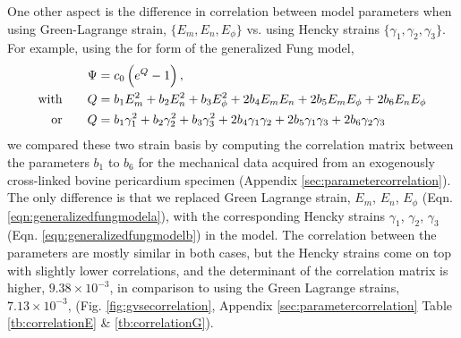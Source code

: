 	One other aspect is the difference in correlation between model parameters when using Green-Lagrange strain, $\{E_m, E_n, E_\phi\}$ vs. using Hencky strains $\{\gamma_1, \gamma_2, \gamma_3 \}$. For example, using the for form of the generalized Fung model,
\begin{subequations} \label{eqn:generalizedfungmodel}
\begin{align}
\Psi 	&= c_0 \left(e^{Q} - 1\right),\notag \\
\mathrm{with}	\qquad	Q	&= b_1 E_m^2 + b_2 E_n^2 + b_3 E_\phi^2 + 2 b_4 E_m E_n + 2 b_5 E_mE_\phi + 2 b_6 E_nE_\phi	\label{eqn:generalizedfungmodela} \\ 
\mathrm{or}		\qquad	Q	&= b_1 \gamma_1^2 + b_2 \gamma_2^2 + b_3 \gamma_3^2 + 2 b_4 \gamma_1\gamma_2 + 2 b_5 \gamma_1\gamma_3 + 2 b_6 \gamma_2\gamma_3	\label{eqn:generalizedfungmodelb} 
\end{align}
\end{subequations}
we compared these two strain basis by computing the correlation matrix between the parameters $b_1$ to $b_6$ for the mechanical data acquired from an exogenously cross-linked bovine pericardium specimen \cite{sun_response_2004} (Appendix \ref{sec:parametercorrelation}). The only difference is that we replaced Green Lagrange strain, $E_m$, $E_n$, $E_\phi$ (Eqn. \ref{eqn:generalizedfungmodela}), with the corresponding Hencky strains $\gamma_1$, $\gamma_2$, $\gamma_3$ (Eqn. \ref{eqn:generalizedfungmodelb}) in the model. The correlation between the parameters are mostly similar in both cases, but the Hencky strains come on top with slightly lower correlations, and the determinant of the correlation matrix is higher, $9.38\times10^{-3}$, in comparison to using the Green Lagrange strains, $7.13\times10^{-3}$, (Fig. \ref{fig:gvsecorrelation}, Appendix \ref{sec:parametercorrelation} Table \ref{tb:correlationE} \& \ref{tb:correlationG}). 



